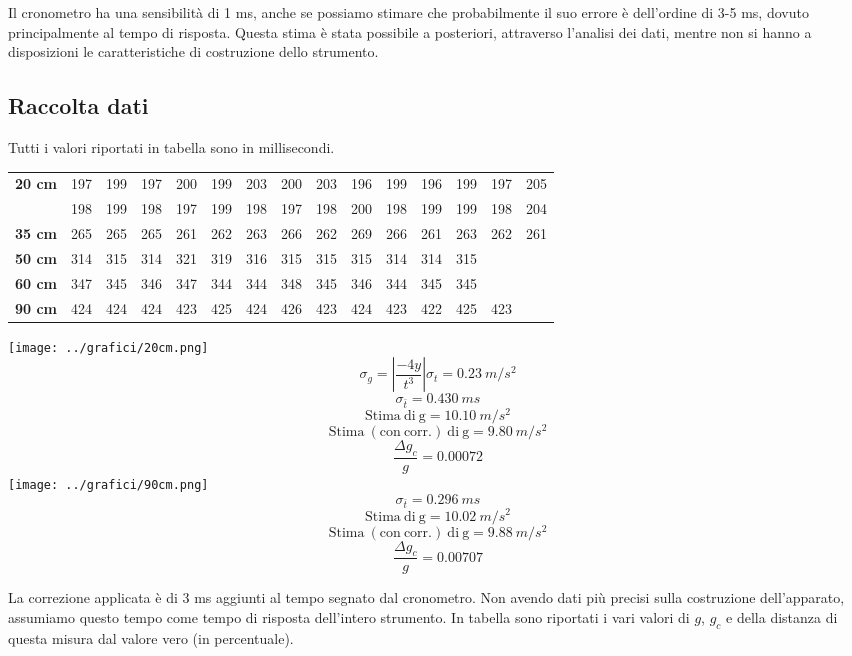 Il cronometro ha una sensibilità di 1 ms, anche se possiamo stimare che probabilmente il suo errore è dell'ordine di 3-5 ms, dovuto principalmente al tempo di risposta. Questa stima è stata possibile a posteriori, attraverso l'analisi dei dati, mentre non si hanno a disposizioni le caratteristiche di costruzione dello strumento.

\subsection{Raccolta dati}
Tutti i valori riportati in tabella sono in millisecondi.
\begin{center}
\begin{tabular}{r|*{14}{c}}
\textbf{20 cm} & 197 & 199 & 197 & 200 & 199 & 203 & 200 & 203 & 196 & 199 & 196 & 199 & 197 & 205\\
& 198 & 199 & 198 & 197 & 199 & 198 & 197 & 198 & 200 & 198 & 199 & 199 & 198 & 204\\
\midrule
\textbf{35 cm} & 265 & 265 & 265 & 261 & 262 & 263 & 266 & 262 & 269 & 266 & 261 & 263 & 262 & 261\\
\midrule
\textbf{50 cm} & 314 & 315 & 314 & 321 & 319 & 316 & 315 & 315 & 315 & 314 & 314 & 315\\
\midrule
\textbf{60 cm} & 347 & 345 & 346 & 347 & 344 & 344 & 348 & 345 & 346 & 344 & 345 & 345\\
\midrule
\textbf{90 cm} & 424& 424& 424& 423& 425& 424& 426& 423& 424& 423& 422& 425& 423\\
\end{tabular}
\end{center}

\begin{center}
\texttt{[image: ../grafici/20cm.png]}
$$\sigma_g = \left|\frac{-4y}{t^3}\right|\sigma_t = 0.23\  m/s^2$$
$$\sigma_{\bar{t}} = 0.430\ ms$$
$$\mathrm{Stima\ di\ g} = 10.10\ m/s^2$$
$$\mathrm{Stima\ (con\ corr.)\ di\ g} = 9.80\ m/s^2 $$
$$\frac{\Delta g_c}{g} = 0.00072$$
\texttt{[image: ../grafici/90cm.png]}
$$\sigma_{\bar{t}} = 0.296\ ms $$
$$\mathrm{Stima\ di\ g} = 10.02\ m/s^2$$
$$\mathrm{Stima\ (con\ corr.)\ di\ g} = 9.88\ m/s^2 $$
$$\frac{\Delta g_c}{g} = 0.00707$$
\end{center}

La correzione applicata è di 3 ms aggiunti al tempo segnato dal cronometro. Non avendo dati più precisi sulla costruzione dell'apparato, assumiamo questo tempo come tempo di risposta dell'intero strumento. In tabella sono riportati i vari valori di $g$, $g_c$ e della distanza di questa misura dal valore vero (in percentuale). 

